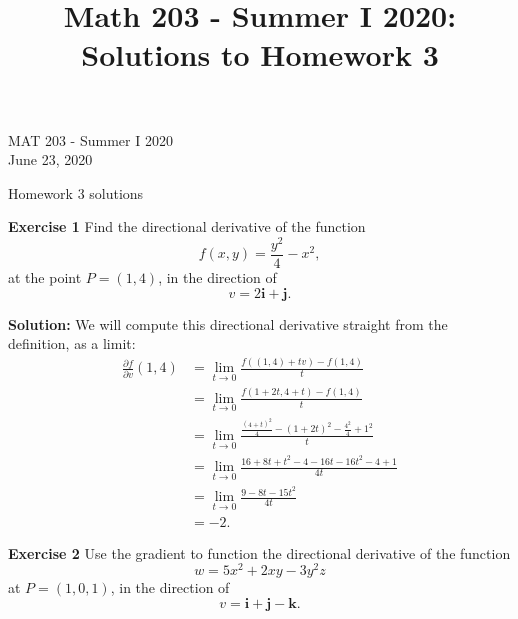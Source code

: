 \documentclass[12pt,oneside]{exam}
\title{Math 203 - Summer I 2020: Solutions to Homework 3}
\newenvironment{exercise}[1]{\vspace{.1in}\noindent\textbf{Exercise #1 \hspace{.05em}}}{}
\newenvironment{newsolution}{\vspace{.1in}\noindent\textbf{Solution: \hspace{.05em}}}{}
\begin{document}
\begin{flushright}
\sc MAT 203 - Summer I 2020\\
June 23, 2020
\end{flushright}
\bigskip
 
\begin{center}
\textsf{Homework 3 solutions} 
\end{center}


\begin{exercise}{1}
Find the directional derivative of the function
\begin{equation*}
f(x,y)= \frac{y^2}{4} - x^2,
\end{equation*}
at the point $P=(1,4)$, in the direction of
\begin{equation*}
v = 2\mathbf{i} + \mathbf{j}.
\end{equation*}
\end{exercise}

\begin{newsolution} 
We will compute this directional derivative straight from the definition, as a limit:
\begin{align*}
\frac{\partial f}{\partial v} (1,4) & = \lim_{t \to 0} \frac{ f((1,4)+tv)-f(1,4)}{t} \\
& =\lim_{t \to 0} \frac{ f(1+2t,4+t)-f(1,4)}{t}\\
& = \lim_{t \to 0} \frac{ \frac{(4+t)^2}{4} - (1+2t)^2-\frac{4^2}{4}+1^2}{t}\\
& = \lim_{t \to 0} \frac{16+8t+t^2-4-16t-16t^2-4+1}{4t}\\
& = \lim_{t \to 0} \frac{9-8t-15t^2}{4t} \\
& = -2.
\end{align*}
\end{newsolution}

\begin{exercise}{2}
Use the gradient to function the directional derivative of the function
\begin{equation*}
w = 5x^2 + 2xy -3y^2z
\end{equation*}
at $P=(1,0,1)$, in the direction of
\begin{equation*}
v = \mathbf{i} + \mathbf{j} - \mathbf{k}.
\end{equation*}
\end{exercise}
\end{document}
